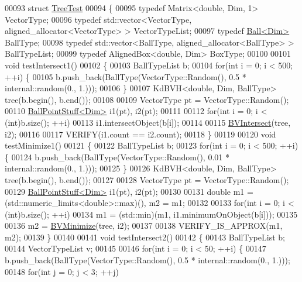 \begin{DoxyCode}
00093 \textcolor{keyword}{struct }\hyperlink{struct_tree_test}{TreeTest}
00094 \{
00095   \textcolor{keyword}{typedef} Matrix<double, Dim, 1> VectorType;
00096   \textcolor{keyword}{typedef} std::vector<VectorType, aligned\_allocator<VectorType> > VectorTypeList;
00097   \textcolor{keyword}{typedef} \hyperlink{struct_ball}{Ball<Dim>} BallType;
00098   \textcolor{keyword}{typedef} std::vector<BallType, aligned\_allocator<BallType> > BallTypeList;
00099   \textcolor{keyword}{typedef} AlignedBox<double, Dim> BoxType;
00100 
00101   \textcolor{keywordtype}{void} testIntersect1()
00102   \{
00103     BallTypeList b;
00104     \textcolor{keywordflow}{for}(\textcolor{keywordtype}{int} i = 0; i < 500; ++i) \{
00105         b.push\_back(BallType(VectorType::Random(), 0.5 * internal::random(0., 1.)));
00106     \}
00107     KdBVH<double, Dim, BallType> tree(b.begin(), b.end());
00108 
00109     VectorType pt = VectorType::Random();
00110     \hyperlink{struct_ball_point_stuff}{BallPointStuff<Dim>} i1(pt), i2(pt);
00111 
00112     \textcolor{keywordflow}{for}(\textcolor{keywordtype}{int} i = 0; i < (int)b.size(); ++i)
00113       i1.intersectObject(b[i]);
00114 
00115     \hyperlink{namespace_eigen_a07d8e283f082c972338f3fc4f644b2a9}{BVIntersect}(tree, i2);
00116 
00117     VERIFY(i1.count == i2.count);
00118   \}
00119 
00120   \textcolor{keywordtype}{void} testMinimize1()
00121   \{
00122     BallTypeList b;
00123     \textcolor{keywordflow}{for}(\textcolor{keywordtype}{int} i = 0; i < 500; ++i) \{
00124         b.push\_back(BallType(VectorType::Random(), 0.01 * internal::random(0., 1.)));
00125     \}
00126     KdBVH<double, Dim, BallType> tree(b.begin(), b.end());
00127 
00128     VectorType pt = VectorType::Random();
00129     \hyperlink{struct_ball_point_stuff}{BallPointStuff<Dim>} i1(pt), i2(pt);
00130 
00131     \textcolor{keywordtype}{double} m1 = (std::numeric\_limits<double>::max)(), m2 = m1;
00132 
00133     \textcolor{keywordflow}{for}(\textcolor{keywordtype}{int} i = 0; i < (int)b.size(); ++i)
00134       m1 = (std::min)(m1, i1.minimumOnObject(b[i]));
00135 
00136     m2 = \hyperlink{namespace_eigen_adcbe73ac1482eacab0e18ee32c25508e}{BVMinimize}(tree, i2);
00137 
00138     VERIFY\_IS\_APPROX(m1, m2);
00139   \}
00140 
00141   \textcolor{keywordtype}{void} testIntersect2()
00142   \{
00143     BallTypeList b;
00144     VectorTypeList v;
00145 
00146     \textcolor{keywordflow}{for}(\textcolor{keywordtype}{int} i = 0; i < 50; ++i) \{
00147         b.push\_back(BallType(VectorType::Random(), 0.5 * internal::random(0., 1.)));
00148         \textcolor{keywordflow}{for}(\textcolor{keywordtype}{int} j = 0; j < 3; ++j)

\end{DoxyCode}
